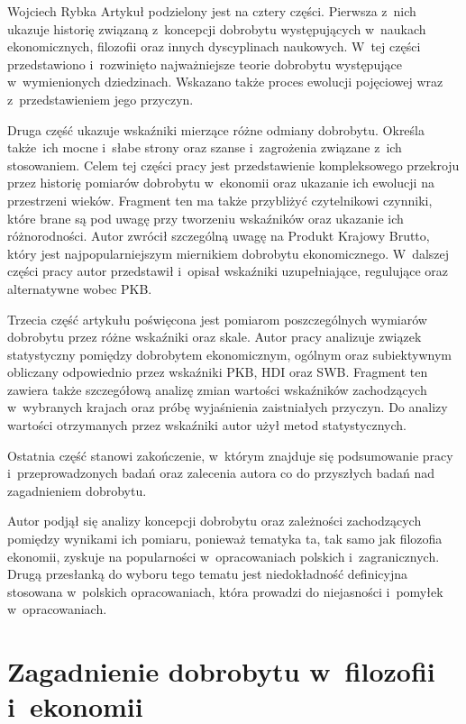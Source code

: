 \begin{artplenv}{Wojciech Rybka}
Artykuł podzielony jest na cztery części. Pierwsza z~nich ukazuje historię związaną z~koncepcji dobrobytu występujących
w~naukach ekonomicznych, filozofii oraz innych dyscyplinach naukowych. W~tej części przedstawiono i~rozwinięto
najważniejsze teorie dobrobytu występujące w~wymienionych dziedzinach. Wskazano także proces ewolucji pojęciowej
wraz z~przedstawieniem jego przyczyn.

Druga część ukazuje wskaźniki mierzące różne odmiany dobrobytu. Określa także~ich mocne i~słabe strony oraz
szanse i~zagrożenia związane z~ich stosowaniem. Celem tej części pracy jest przedstawienie kompleksowego przekroju przez
historię pomiarów dobrobytu w~ekonomii oraz ukazanie ich ewolucji na przestrzeni wieków. Fragment ten ma także
przybliżyć czytelnikowi czynniki, które brane są pod uwagę przy tworzeniu wskaźników oraz ukazanie ich różnorodności.
Autor zwrócił szczególną uwagę na Produkt Krajowy Brutto, który jest najpopularniejszym miernikiem dobrobytu
ekonomicznego. W~dalszej części pracy autor przedstawił i~opisał wskaźniki uzupełniające, regulujące oraz alternatywne
wobec PKB.

Trzecia część artykułu poświęcona jest pomiarom poszczególnych wymiarów dobrobytu przez różne wskaźniki oraz skale.
Autor pracy analizuje związek statystyczny pomiędzy dobrobytem ekonomicznym, ogólnym oraz subiektywnym obliczany
odpowiednio przez wskaźniki PKB, HDI oraz SWB. Fragment ten zawiera także szczegółową analizę zmian wartości wskaźników
zachodzących w~wybranych krajach oraz próbę wyjaśnienia zaistniałych przyczyn. Do analizy wartości otrzymanych przez
wskaźniki autor użył metod statystycznych.

Ostatnia część stanowi zakończenie, w~którym znajduje się podsumowanie pracy  i~przeprowadzonych badań oraz zalecenia
autora co do przyszłych badań nad zagadnieniem dobrobytu.

Autor podjął się analizy koncepcji dobrobytu oraz zależności zachodzących pomiędzy wynikami ich pomiaru, ponieważ
tematyka ta, tak samo jak filozofia ekonomii, zyskuje na popularności w~opracowaniach polskich i~zagranicznych. Drugą
przesłanką do wyboru tego tematu jest niedokładność definicyjna stosowana w~polskich opracowaniach, która prowadzi do
niejasności i~pomyłek w~opracowaniach.

\section{Zagadnienie dobrobytu w~filozofii i~ekonomii}
\baselineskip

\end{artplenv}
